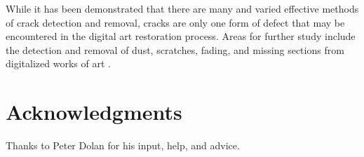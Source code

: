 \documentclass{sig-alternate}
\begin{document}
While it has been demonstrated that there are many and varied effective methods of crack detection and removal, cracks are only one form of defect that may be encountered in the digital art restoration process. Areas for further study include the detection and removal of dust, scratches, fading, and missing sections from digitalized works of art \cite{TopHat:2010}.

\section{Acknowledgments}
Thanks to Peter Dolan for his input, help, and advice.


  
\end{document}

